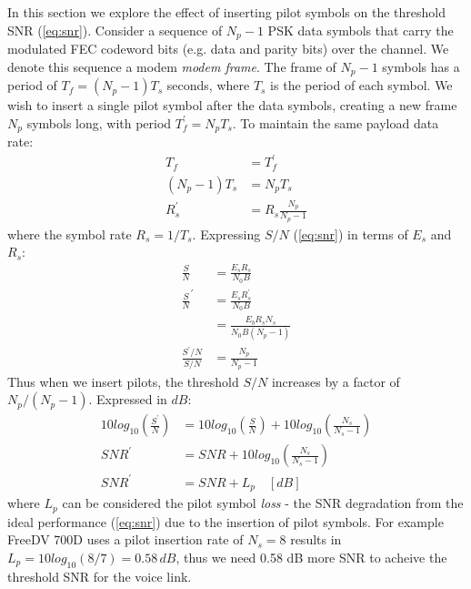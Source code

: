 \documentclass{article}
\begin{document}
In this section we explore the effect of inserting pilot symbols on the threshold SNR (\ref{eq:snr}). Consider a sequence of $N_p-1$ PSK data symbols that carry the modulated FEC codeword bits (e.g. data and parity bits) over the channel. We denote this sequence a modem \emph{modem frame}. The frame of $N_p-1$ symbols has a period of $T_f=(N_p-1)T_s$ seconds, where $T_s$ is the period of each symbol.  We wish to insert a single pilot symbol after the data symbols, creating a new frame $N_p$ symbols long, with period $T^\prime_f=N_pT_s$.  To maintain the same payload data rate:
\begin{equation}
\begin{split}
T_f &= T^\prime_f \\
(N_p-1)T_s &= N_pT_s \\
R^\prime_s &= R_s\frac{N_p}{N_p-1}
\end{split}
\end{equation}
where the symbol rate $R_s=1/T_s$.  Expressing $S/N$ (\ref{eq:snr}) in terms of $E_s$ and $R_s$:
\begin{equation}
\label{eq_snr_s}
\begin{split}
\frac{S}{N} &= \frac{E_sR_s}{N_0B} \\
\frac{S}{N}^\prime &= \frac{E_sR^\prime_s}{N_0B} \\
                   &= \frac{E_bR_sN_s}{N_0B(N_p-1)} \\
\frac{S^\prime/N}{S/N} &= \frac{N_p}{N_p-1}
\end{split}
\end{equation}
Thus when we insert pilots, the threshold $S/N$ increases by a factor of $N_p/(N_p-1)$. Expressed in $\si{dB}$:
\begin{equation}
\begin{split}
10log_{10}\left(\frac{S^\prime}{N}\right) &= 10log_{10}\left(\frac{S}{N}\right) + 10log_{10}\left(\frac{N_s}{N_s-1}\right) \\
SNR^\prime &= SNR + 10log_{10}\left(\frac{N_s}{N_s-1}\right) \\
SNR^\prime &= SNR + L_p  \quad [\si{dB}]
\end{split}
\end{equation}
where $L_p$ can be considered the pilot symbol \emph{loss} - the SNR degradation from the ideal performance (\ref{eq:snr}) due to the insertion of pilot symbols. For example FreeDV 700D uses a pilot insertion rate of $N_s=8$ results in $L_p=10log_{10}(8/7)=0.58 \, \si{dB}$, thus we need 0.58 dB more SNR to acheive the threshold SNR for the voice link.
\end{document}
